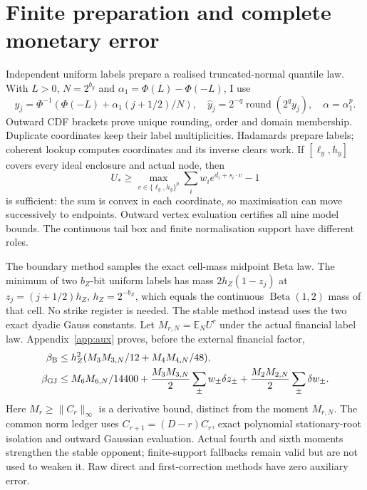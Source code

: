 \documentclass[11pt]{article}
\newcommand{\E}{\mathbb E}
\begin{document}
\section{Finite preparation and complete monetary error}
\label{sec:finite}

Independent uniform labels prepare a realised truncated-normal quantile
law. With $L>0$, $N=2^{b_y}$ and $\alpha_1=\Phi(L)-\Phi(-L)$, I use
\begin{equation}
 y_j=\Phi^{-1}(\Phi(-L)+\alpha_1(j+1/2)/N),\quad
 \widehat y_j=2^{-q}\operatorname{round}(2^qy_j),\quad \alpha=\alpha_1^p.
 \label{eq:quantile-grid}
\end{equation}
Outward CDF brackets prove unique rounding, order and domain membership.
Duplicate coordinates keep their label multiplicities. Hadamards prepare
labels; coherent lookup computes coordinates and its inverse clears work.
If $[\ell_y,h_y]$ covers every ideal enclosure and actual node, then
\begin{equation}
 U_*\geq\max_{v\in\{\ell_y,h_y\}^p}\sum_iw_ie^{d_i+s_i\cdot v}-1
 \label{eq:finite-vertex}
\end{equation}
is sufficient: the sum is convex in each coordinate, so maximisation can
move successively to endpoints. Outward vertex evaluation certifies all
nine model bounds. The continuous tail box and finite normalisation support
have different roles.

The boundary method samples the exact cell-mass midpoint Beta law. The
minimum of two $b_Z$-bit uniform labels has mass $2h_Z(1-z_j)$ at
$z_j=(j+1/2)h_Z$, $h_Z=2^{-b_Z}$, which equals the continuous
$\operatorname{Beta}(1,2)$ mass of that cell. No strike register is needed.
The stable method instead uses the two exact dyadic Gauss constants.
Let $M_{r,N}=\E_NU^r$ under the actual financial label law. Appendix~\ref{app:aux}
proves, before the external financial factor,
\begin{align}
 \beta_{\rm B}&\leq h_Z^2(M_3M_{3,N}/12+M_4M_{4,N}/48),
 \label{eq:beta-error}\\
 \beta_{\rm GJ}&\leq M_6M_{6,N}/14400+
 \frac{M_3M_{3,N}}2\sum_\pm w_\pm\delta z_\pm+
 \frac{M_2M_{2,N}}2\sum_\pm\delta w_\pm.
 \label{eq:gauss-error}
\end{align}
Here $M_r\geq\|C_r\|_\infty$ is a derivative bound, distinct from the
moment $M_{r,N}$. The common norm ledger uses
$C_{r+1}=(D-r)C_r$, exact polynomial stationary-root isolation and outward
Gaussian evaluation. Actual fourth and sixth moments strengthen the
stable opponent; finite-support fallbacks remain valid but are not used
to weaken it. Raw direct and first-correction methods have zero auxiliary
error.
\end{document}
